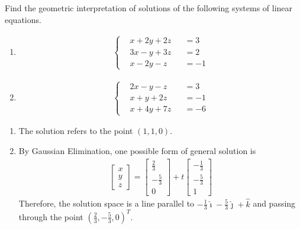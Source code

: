 \begin{Exercise}
Find the geometric interpretation of solutions of the following systems of linear equations.
\begin{enumerate}[label=(\alph*)]
\item 
\begin{align*}
\left\{\begin{alignedat}{2}
&x + 2y + 2z& &= 3\\
&3x - y + 3z& &= 2\\
&x - 2y - z& &= -1
\end{alignedat}\right.
\end{align*}
\item
\begin{align*}
\left\{\begin{alignedat}{2}
&2x - y - z& &= 3\\
&x + y + 2z& &= -1\\
&x + 4y + 7z& &= -6
\end{alignedat}\right.
\end{align*}
\end{enumerate}
\end{Exercise}
\begin{Answer}
\begin{enumerate}[label=(\alph*)]
\item The solution refers to the point $(1,1,0)$.
\item By Gaussian Elimination, one possible form of general solution is 
\begin{align*}
\begin{bmatrix}
x\\
y\\
z
\end{bmatrix}
=
\begin{bmatrix}
\frac{2}{3}\\
-\frac{5}{3}\\
0
\end{bmatrix}
+
t
\begin{bmatrix}
-\frac{1}{3}\\
-\frac{5}{3}\\
1
\end{bmatrix}    
\end{align*} 
Therefore, the solution space is a line parallel to 
$-\frac{1}{3}\hat{\imath} - \frac{5}{3}\hat{\jmath} + \hat{k}$ and passing through the point $(\frac{2}{3}, -\frac{5}{3}, 0)^T$.
\end{enumerate}
\end{Answer}